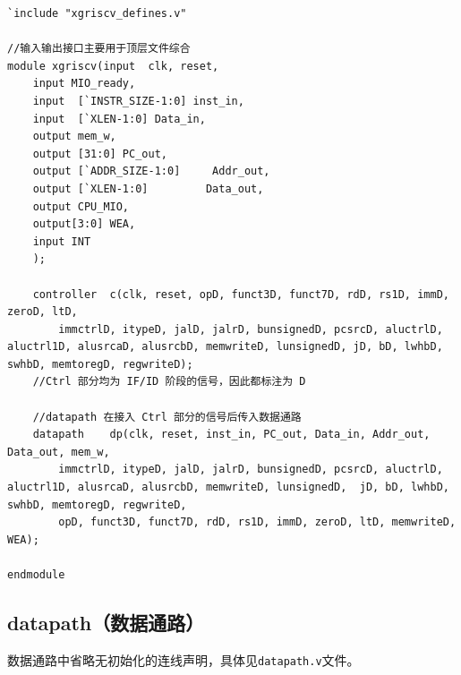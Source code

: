 \documentclass[UTF8,a4paper,autofakebold,15pt]{ctexart}
\begin{document}
{\lstset{language=verilog}
	\begin{lstlisting}
`include "xgriscv_defines.v"

//输入输出接口主要用于顶层文件综合
module xgriscv(input  clk, reset,
	input MIO_ready,
	input  [`INSTR_SIZE-1:0] inst_in,
	input  [`XLEN-1:0] Data_in,
	output mem_w,
	output [31:0] PC_out,
	output [`ADDR_SIZE-1:0] 	Addr_out, 
	output [`XLEN-1:0] 		   Data_out,
	output CPU_MIO,
	output[3:0] WEA,
	input INT
	);

	controller  c(clk, reset, opD, funct3D, funct7D, rdD, rs1D, immD, zeroD, ltD,
		immctrlD, itypeD, jalD, jalrD, bunsignedD, pcsrcD, aluctrlD, aluctrl1D, alusrcaD, alusrcbD, memwriteD, lunsignedD, jD, bD, lwhbD, swhbD, memtoregD, regwriteD);
	//Ctrl 部分均为 IF/ID 阶段的信号，因此都标注为 D

	//datapath 在接入 Ctrl 部分的信号后传入数据通路
	datapath    dp(clk, reset, inst_in, PC_out, Data_in, Addr_out, Data_out, mem_w, 
		immctrlD, itypeD, jalD, jalrD, bunsignedD, pcsrcD, aluctrlD, aluctrl1D, alusrcaD, alusrcbD, memwriteD, lunsignedD,  jD, bD, lwhbD, swhbD, memtoregD, regwriteD, 
		opD, funct3D, funct7D, rdD, rs1D, immD, zeroD, ltD, memwriteD, WEA);

endmodule
\end{lstlisting}}

\subsection{datapath（数据通路）}

数据通路中省略无初始化的连线声明，具体见{\tt datapath.v}文件。
\end{document}
